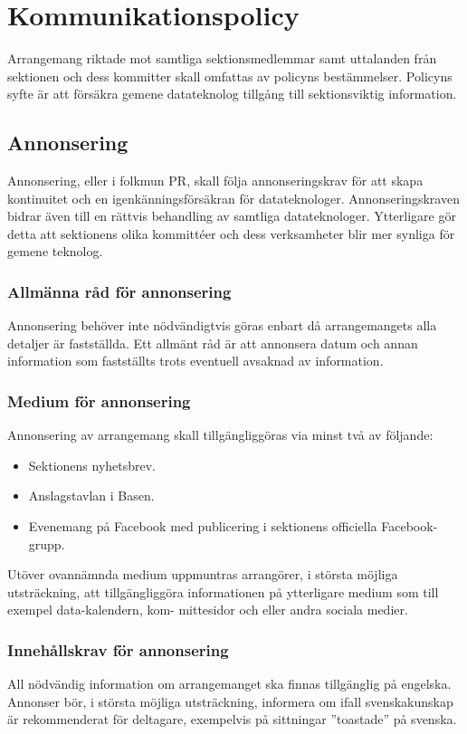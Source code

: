\section{Kommunikationspolicy}
Arrangemang riktade mot samtliga sektionsmedlemmar samt uttalanden från sektionen och dess kommitter skall omfattas av policyns bestämmelser. Policyns syfte är att försäkra gemene datateknolog tillgång till sektionsviktig information.

\subsection{Annonsering}
Annonsering, eller i folkmun PR, skall följa annonseringskrav för att skapa kontinuitet
och en igenkänningsförsäkran för datateknologer. Annonseringskraven bidrar även till en
rättvis behandling av samtliga datateknologer. Ytterligare gör detta att sektionens olika
kommittéer och dess verksamheter blir mer synliga för gemene teknolog.

\subsubsection{Allmänna råd för annonsering}
Annonsering behöver inte nödvändigtvis göras enbart då arrangemangets alla detaljer är
fastställda. Ett allmänt råd är att annonsera datum och annan information som fastställts
trots eventuell avsaknad av information.

\subsubsection{Medium för annonsering}
Annonsering av arrangemang skall tillgängliggöras via minst två av följande:
\begin{itemize}
    \item Sektionens nyhetsbrev.
    \item Anslagstavlan i Basen.
    \item Evenemang på Facebook med publicering i sektionens officiella Facebook-grupp.
\end{itemize}
Utöver ovannämnda medium uppmuntras arrangörer, i största möjliga utsträckning, att
tillgängliggöra informationen på ytterligare medium som till exempel data-kalendern, kom-
mittesidor och eller andra sociala medier.

\subsubsection{Innehållskrav för annonsering}
All nödvändig information om arrangemanget ska finnas tillgänglig på engelska. Annonser
bör, i största möjliga utsträckning, informera om ifall svenskakunskap är rekommenderat
för deltagare, exempelvis på sittningar ”toastade” på svenska.

